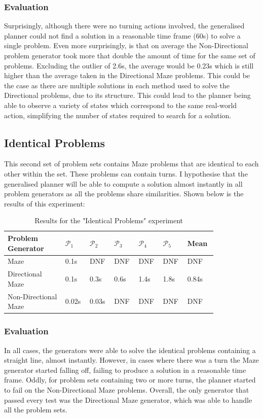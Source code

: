 \subsubsection{Evaluation}
Surprisingly, although there were no turning actions involved, the generalised planner could not find a solution in a reasonable time frame (60s) to solve a single problem. Even more surprisingly, is that on average the Non-Directional problem generator took more that double the amount of time for the same set of problems. Excluding the outlier of 2.6s, the average would be 0.23s which is still higher than the average taken in the Directional Maze problems. This could be the case as there are multiple solutions in each method used to solve the Directional problems, due to its structure. This could lead to the planner being able to observe a variety of states which correspond to the same real-world action, simplifying the number of states required to search for a solution. 

\subsection{Identical Problems}
This second set of problem sets contains Maze problems that are identical to each other within the set. These problems can contain turns. I hypothesise that the generalised planner will be able to compute a solution almost instantly in all problem generators as all the problems share similarities. Shown below is the results of this experiment:

\begin{table}[ht]
\centering
\begin{tabular}{|p{0.25\linewidth}|p{0.09\linewidth}|p{0.09\linewidth}|p{0.09\linewidth}|p{0.09\linewidth}|p{0.09\linewidth}|p{0.12\linewidth}|}
\hline
Problem Generator & $\mathcal{P}_1$ & $\mathcal{P}_2$ & $\mathcal{P}_3$ & $\mathcal{P}_4$ & $\mathcal{P}_5$ & Mean \\\hline
Maze & 0.1s & DNF & DNF & DNF & DNF & DNF
\\\hline
Directional Maze & 0.1s & 0.3s & 0.6s & 1.4s & 1.8s & 0.84s
\\\hline
Non-Directional Maze & 0.02s & 0.03s & DNF & DNF & DNF & DNF
\\\hline
\end{tabular}
\caption{Results for the "Identical Problems" experiment}
\end{table}

\subsubsection{Evaluation}
In all cases, the generators were able to solve the identical problems containing a straight line, almost instantly. However, in cases where there was a turn the Maze generator started falling off, failing to produce a solution in a reasonable time frame. Oddly, for problem sets containing two or more turns, the planner started to fail on the Non-Directional Maze problems. Overall, the only generator that passed every test was the Directional Maze generator, which was able to handle all the problem sets.

